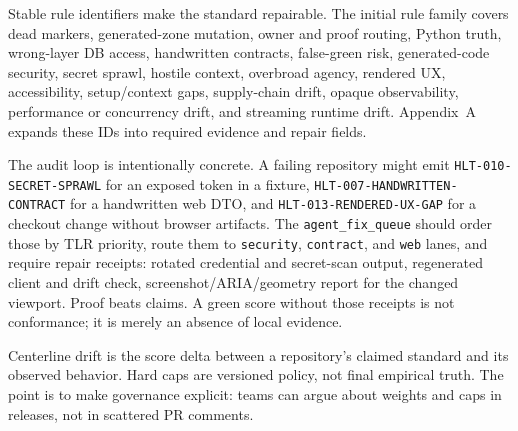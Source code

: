 Stable rule identifiers make the standard repairable. The initial rule family covers dead markers, generated-zone mutation, owner and proof routing, Python truth, wrong-layer DB access, handwritten contracts, false-green risk, generated-code security, secret sprawl, hostile context, overbroad agency, rendered UX, accessibility, setup/context gaps, supply-chain drift, opaque observability, performance or concurrency drift, and streaming runtime drift. Appendix~A expands these IDs into required evidence and repair fields.

The audit loop is intentionally concrete. A failing repository might emit \texttt{HLT-010-SECRET-SPRAWL} for an exposed token in a fixture, \texttt{HLT-007-HANDWRITTEN-CONTRACT} for a handwritten web DTO, and \texttt{HLT-013-RENDERED-UX-GAP} for a checkout change without browser artifacts. The \texttt{agent\_fix\_queue} should order those by TLR priority, route them to \texttt{security}, \texttt{contract}, and \texttt{web} lanes, and require repair receipts: rotated credential and secret-scan output, regenerated client and drift check, screenshot/ARIA/geometry report for the changed viewport. Proof beats claims. A green score without those receipts is not conformance; it is merely an absence of local evidence.

Centerline drift is the score delta between a repository's claimed standard and its observed behavior. Hard caps are versioned policy, not final empirical truth. The point is to make governance explicit: teams can argue about weights and caps in releases, not in scattered PR comments.
